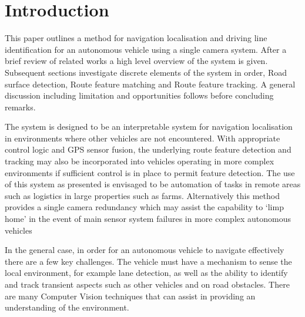 \documentclass[]{aiaa-tc}%
\begin{document}

\newpage
\section{Introduction} \label{sect:intro}

%
%

This paper outlines a method for navigation localisation and driving line identification for an autonomous vehicle using a single camera system. After a brief review of related works a high level overview of the system is given. Subsequent sections investigate discrete elements of the system in order, Road surface detection, Route feature matching and Route feature tracking. A general discussion including limitation and opportunities follows before concluding remarks.

The system is designed to be an interpretable system for navigation localisation in environments where other vehicles are not encountered. With appropriate control logic and GPS sensor fusion, the underlying route feature detection and tracking may also be incorporated into vehicles operating in more complex environments if sufficient control is in place to permit feature detection. The use of this system as presented is envisaged to be automation of tasks in remote areas such as logistics in large properties such as farms. Alternatively this method provides a single camera redundancy which may assist the capability to `limp home' in the event of main sensor system failures in more complex autonomous vehicles

In the general case, in order for an autonomous vehicle to navigate effectively there are a few key challenges. The vehicle must have a mechanism to sense the local environment, for example lane detection, as well as the ability to identify and track transient aspects such as other vehicles and on road obstacles. There are many Computer Vision techniques that can assist in providing an understanding of the environment. 
\end{document}
